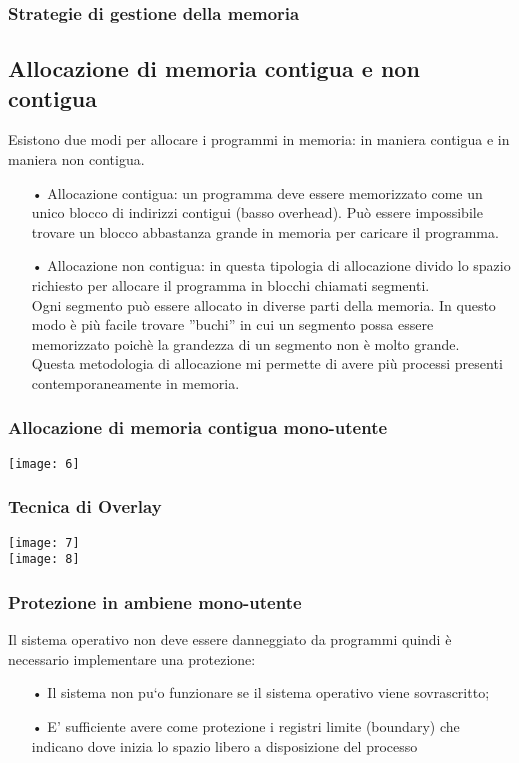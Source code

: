 \documentclass{article}
\begin{document}
\subsubsection{Strategie di gestione della memoria}

\subsection{Allocazione di memoria contigua e non contigua}
Esistono due modi per allocare i programmi in memoria: in maniera contigua e
in maniera non contigua.
\begin{enumerate}
\item[•] Allocazione contigua: un programma deve essere memorizzato come un
unico blocco di indirizzi contigui (basso overhead). Può essere impossibile trovare un blocco abbastanza grande in memoria per caricare il programma.
\item[•] Allocazione non contigua: in questa tipologia di allocazione divido lo
spazio richiesto per allocare il programma in blocchi chiamati segmenti.
\\Ogni segmento può essere allocato in diverse parti della memoria. In
questo modo è più facile trovare ”buchi” in cui un segmento possa essere memorizzato poichè la grandezza di un segmento non è molto grande.
\\Questa metodologia di allocazione mi permette di avere più processi presenti contemporaneamente in memoria.
\end{enumerate}

\subsubsection{Allocazione di memoria contigua mono-utente}
\texttt{[image: 6]}

\subsubsection{Tecnica di Overlay}
\texttt{[image: 7]}\\
\texttt{[image: 8]}

\subsubsection{Protezione in ambiene mono-utente}
Il sistema operativo non deve essere danneggiato da programmi quindi è necessario implementare una protezione:
\begin{enumerate}
   \item[•] Il sistema non pu`o funzionare se il sistema operativo viene sovrascritto;
   \item[•] E' sufficiente avere come protezione i registri limite (boundary) che indicano dove inizia lo spazio libero a disposizione del processo
\end{enumerate}
\end{document}
